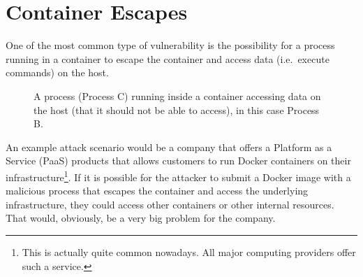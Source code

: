 \section{Container Escapes}\label{subsection:container-escape}
One of the most common type of vulnerability is the possibility for a process running in a container to escape the container and access data (i.e.\ execute commands) on the host.
\begin{figure}[ht]
    \centering
    \caption{}\label{fig:container-escape}
    \medskip
    \small
    A process (Process C) running inside a container accessing data on the host (that it should not be able to access), in this case Process B.
\end{figure}

\medskip

An example attack scenario would be a company that offers a Platform as a Service (PaaS) products that allows customers to run Docker containers on their infrastructure\footnote{This is actually quite common nowadays. All major computing providers offer such a service.}. If it is possible for the attacker to submit a Docker image with a malicious process that escapes the container and access the underlying infrastructure, they could access other containers or other internal resources. That would, obviously, be a very big problem for the company.

